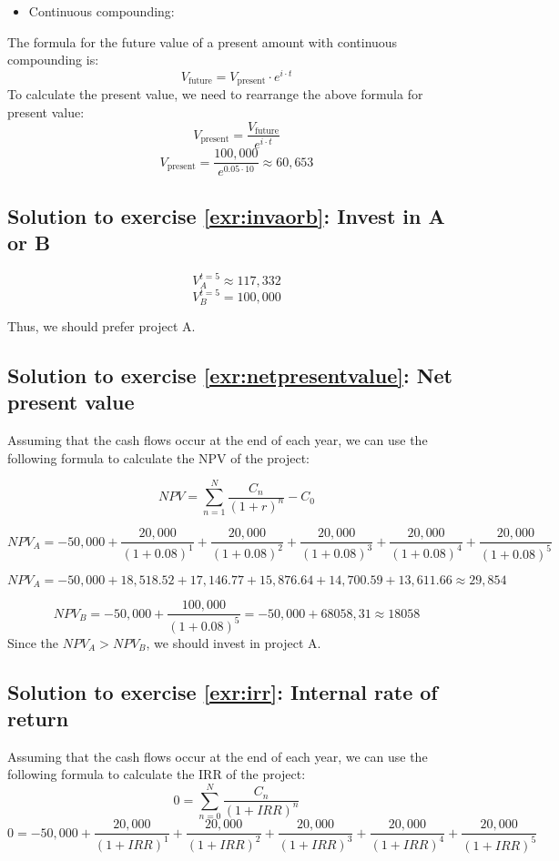 \documentclass[
  12pt,
  oneside]{book}
\providecommand{\tightlist}{%
  \setlength{\itemsep}{0pt}\setlength{\parskip}{0pt}}
\theoremstyle{definition}
\theoremstyle{definition}
\theoremstyle{definition}
\theoremstyle{definition}
\theoremstyle{remark}
\begin{document}
\begin{itemize}
\tightlist
\item
  Continuous compounding:
\end{itemize}

The formula for the future value of a present amount with continuous compounding is:
\[
V_{\text{future}} = V_{\text{present}} \cdot e^{i \cdot t}
\]
To calculate the present value, we need to rearrange the above formula for present value:
\[
V_{\text{present}}  = \frac{V_{\text{future}}}{e^{i\cdot t}}
\]
\[
V_{\text{present}} = \frac{100,000}{e^{0.05 \cdot 10}} \approx 60,653
\]

\subsection*{Solution to exercise \ref{exr:invaorb}: Invest in A or B}\label{sol:invaorb}

\[
V_{A}^{t=5}\approx 117,332
\]
\[
V_{B}^{t=5}= 100,000
\]

Thus, we should prefer project A.

\subsection*{Solution to exercise \ref{exr:netpresentvalue}: Net present value}\label{sol:netpresentvalue}

Assuming that the cash flows occur at the end of each year, we can use the following formula to calculate the NPV of the project:

\[ 
NPV = \sum_{n=1}^{N} \frac{C_n}{(1+r)^n} - C_0 
\]

\[
NPV_A = -50,000 + \frac{20,000}{(1 + 0.08)^1} + 
    \frac{20,000 }{ (1 + 0.08)^2} + 
        \frac{20,000 }{ (1 + 0.08)^3} + 
            \frac{20,000 }{ (1 + 0.08)^4} + 
                \frac{20,000 }{ (1 + 0.08)^5}
\]

\[
NPV_A = -50,000 + 18,518.52 + 17,146.77 + 15,876.64 + 14,700.59 + 13,611.66 \approx 29,854
\]

\[
NPV_B = -50,000 + \frac{100,000 }{ (1 + 0.08)^5} = -50,000+68058,31\approx 18058
\]
Since the \(NPV_A>NPV_B\), we should invest in project A.

\subsection*{Solution to exercise \ref{exr:irr}: Internal rate of return}\label{sol:irr}

Assuming that the cash flows occur at the end of each year, we can use the following formula to calculate the IRR of the project:
\[ 0 = \sum_{n=0}^{N} \frac{C_n}{(1+IRR)^n}  \]
\[
0 = -50,000 + 
\frac{20,000}{(1 + IRR)^1} 
+ \frac{20,000 }{ (1 + IRR)^2 }
+ \frac{20,000 }{ (1 + IRR)^3 }
+ \frac{20,000 }{ (1 + IRR)^4 }
+ \frac{20,000 }{ (1 + IRR)^5 }
\]
\end{document}
